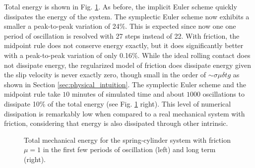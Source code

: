 Total energy is shown in Fig. \ref{fig:spring_cylinder_energy}. As before, the
implicit Euler scheme quickly dissipates the energy of the system. The
symplectic Euler scheme now exhibits a smaller a peak-to-peak variation of 24\%.
This is expected since now one one period of oscillation is resolved with 27
steps instead of 22. With friction, the midpoint rule does not conserve energy
exactly, but it does significantly better with a peak-to-peak variation of only
0.16\%. While the ideal rolling contact does not dissipate energy, the
regularized model of friction does dissipate energy given the slip velocity is
never exactly zero, though small in the order of $\sim\sigma\mu\delta t g$ as shown
in Section \ref{sec:physical_intuition}. The symplectic Euler scheme and the
midpoint rule take $10$ minutes of simulated time and about $1000$ oscillations
to dissipate 10\% of the total energy (see Fig. \ref{fig:spring_cylinder_energy}
right). This level of numerical dissipation is remarkably low when compared to a
real mechanical system with friction, considering that energy is also dissipated
through other intrinsic.
\begin{figure}[!h]
    \centering
    \caption{\label{fig:spring_cylinder_energy} 
    Total mechanical energy for the spring-cylinder system with friction $\mu=1$
    in the first few periods of oscillation (left) and long term (right).}
\end{figure}

